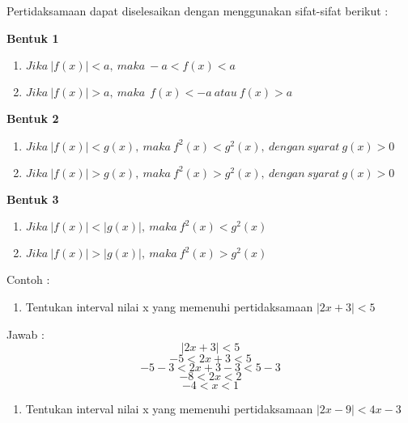 \documentclass[11pt,fleqn]{book} %
\begin{document}
\noindent Pertidaksamaan dapat diselesaikan dengan menggunakan sifat-sifat berikut :

\noindent \textbf{Bentuk 1}

\begin{enumerate}
\item \textbf{ }$Jika\ \left|f\left(x\right)\right|<a,\ maka\ -a<f\left(x\right)<a\ $

\item  $Jika\ \left|f\left(x\right)\right|>a,\ maka\ \ f\left(x\right)<-a\ atau\ f\left(x\right)>a$
\end{enumerate}

\noindent \textbf{Bentuk 2}

\begin{enumerate}
\item \textbf{ }$Jika\ \left|f\left(x\right)\right|<g\left(x\right),\ maka\ f^2\left(x\right)<g^2\left(x\right),\ dengan\ syarat\ g\left(x\right)>0\ $

\item  $Jika\ \left|f\left(x\right)\right|>g\left(x\right),\ maka\ f^2\left(x\right)>g^2\left(x\right),\ dengan\ syarat\ g\left(x\right)>0\ $
\end{enumerate}

\noindent \textbf{Bentuk 3}

\begin{enumerate}
\item \textbf{ }$Jika\ \left|f\left(x\right)\right|<\left|g\left(x\right)\right|,\ maka\ f^2\left(x\right)<g^2\left(x\right)\ $

\item  $Jika\ \left|f\left(x\right)\right|>\left|g\left(x\right)\right|,\ maka\ f^2\left(x\right)>g^2\left(x\right)$
\end{enumerate}

\noindent 

\noindent Contoh :

\begin{enumerate}
\item  Tentukan interval nilai x yang memenuhi pertidaksamaan $\left|2x+3\right|<5$
\end{enumerate}

\noindent Jawab :
\[\left|2x+3\right|<5\] 
\[-5<2x+3<5\] 
\[-5-3<2x+3-3<5-3\] 
\[-8<2x<2\] 
\[-4<x<1\] 


\begin{enumerate}
\item  Tentukan interval nilai x yang memenuhi pertidaksamaan $\left|2x-9\right|<4x-3$
\end{enumerate}
\end{document}

